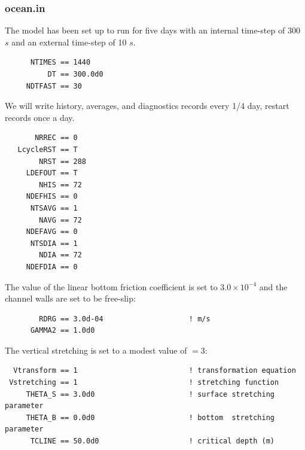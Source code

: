 \subsubsection{ocean.in}
The model has been set up to run for five days with an internal time-step
of 300 $s$ and an external time-step of 10 $s$.
\begin{verbatim}
      NTIMES == 1440
          DT == 300.0d0
     NDTFAST == 30
\end{verbatim}
  We will write history, averages, and diagnostics
records every 1/4 day, restart records once a day.
\begin{verbatim}
       NRREC == 0
   LcycleRST == T
        NRST == 288
     LDEFOUT == T
        NHIS == 72
     NDEFHIS == 0
      NTSAVG == 1
        NAVG == 72
     NDEFAVG == 0
      NTSDIA == 1
        NDIA == 72
     NDEFDIA == 0
\end{verbatim}
  The value of the linear bottom
friction coefficient  is set to $3.0 \times 10^{-4}$ and the
channel walls are set to be free-slip:
\begin{verbatim}
        RDRG == 3.0d-04                    ! m/s
      GAMMA2 == 1.0d0
\end{verbatim}
The vertical stretching is set to a modest value of
$=3$:
\begin{verbatim}
  Vtransform == 1                          ! transformation equation
 Vstretching == 1                          ! stretching function
     THETA_S == 3.0d0                      ! surface stretching parameter
     THETA_B == 0.0d0                      ! bottom  stretching parameter
      TCLINE == 50.0d0                     ! critical depth (m)
\end{verbatim}

